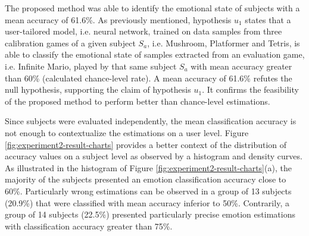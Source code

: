 The proposed method was able to identify the emotional state of subjects with a mean accuracy of 61.6\%. As previously mentioned, hypothesis $u_1$ states that a user-tailored model, i.e. neural network, trained on data samples from three calibration games of a given subject $S_a$, i.e. Mushroom, Platformer and Tetris, is able to classify the emotional state of samples extracted from an evaluation game, i.e. Infinite Mario, played by that same subject $S_a$ with mean accuracy greater than 60\% (calculated chance-level rate). A mean accuracy of 61.6\% refutes the null hypothesis, supporting the claim of hypothesis $u_1$. It confirms the feasibility of the proposed method to perform better than chance-level estimations.

Since subjects were evaluated independently, the mean classification accuracy is not enough to contextualize the estimations on a user level. Figure \ref{fig:experiment2-result-charts} provides a better context of the distribution of accuracy values on a subject level as observed by a histogram and density curves. As illustrated in the histogram of Figure \ref{fig:experiment2-result-charts}(a), the majority of the subjects presented an emotion classification accuracy close to 60\%. Particularly wrong estimations can be observed in a group of 13 subjects (20.9\%) that were classified with mean accuracy inferior to 50\%. Contrarily, a group of 14 subjects (22.5\%) presented particularly precise emotion estimations with classification accuracy greater than 75\%.

